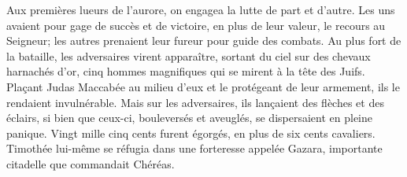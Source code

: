 Aux premières lueurs de l’aurore, on engagea la lutte de part et d’autre.
Les uns avaient pour gage de succès et de victoire, en plus de leur valeur,
	le recours au Seigneur;
	les autres prenaient leur fureur pour guide des combats.
Au plus fort de la bataille,
	les adversaires virent apparaître, sortant du ciel sur des chevaux harnachés d’or,
	cinq hommes magnifiques qui se mirent à la tête des Juifs.
Plaçant Judas Maccabée au milieu d’eux et le protégeant de leur armement,
	ils le rendaient invulnérable.
Mais sur les adversaires, ils lançaient des flèches et des éclairs,
	si bien que ceux-ci, bouleversés et aveuglés, se dispersaient en pleine panique.
Vingt mille cinq cents furent égorgés, en plus de six cents cavaliers.
Timothée lui-même se réfugia dans une forteresse appelée Gazara,
	importante citadelle que commandait Chéréas.
